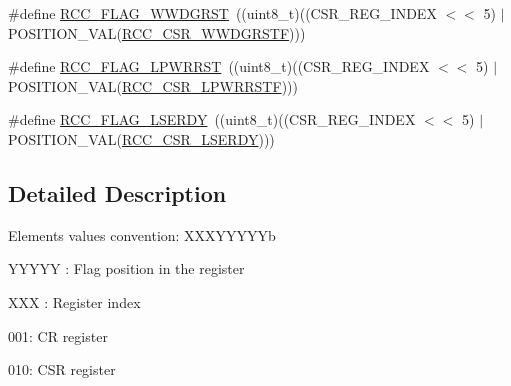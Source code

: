\begin{DoxyCompactItemize}
\item 
\#define \hyperlink{group___r_c_c___flag_gaa80b60b2d497ccd7b7de1075009999a7}{R\-C\-C\-\_\-\-F\-L\-A\-G\-\_\-\-W\-W\-D\-G\-R\-S\-T}~((uint8\-\_\-t)((C\-S\-R\-\_\-\-R\-E\-G\-\_\-\-I\-N\-D\-E\-X $<$$<$ 5) $\vert$ P\-O\-S\-I\-T\-I\-O\-N\-\_\-\-V\-A\-L(\hyperlink{group___peripheral___registers___bits___definition_gacabd7bbde7e78c9c8f5fd46e34771826}{R\-C\-C\-\_\-\-C\-S\-R\-\_\-\-W\-W\-D\-G\-R\-S\-T\-F})))
\item 
\#define \hyperlink{group___r_c_c___flag_ga67049531354aed7546971163d02c9920}{R\-C\-C\-\_\-\-F\-L\-A\-G\-\_\-\-L\-P\-W\-R\-R\-S\-T}~((uint8\-\_\-t)((C\-S\-R\-\_\-\-R\-E\-G\-\_\-\-I\-N\-D\-E\-X $<$$<$ 5) $\vert$ P\-O\-S\-I\-T\-I\-O\-N\-\_\-\-V\-A\-L(\hyperlink{group___peripheral___registers___bits___definition_ga675455250b91f125d52f5d347c2c0fbf}{R\-C\-C\-\_\-\-C\-S\-R\-\_\-\-L\-P\-W\-R\-R\-S\-T\-F})))
\item 
\#define \hyperlink{group___r_c_c___flag_gac9fb963db446c16e46a18908f7fe1927}{R\-C\-C\-\_\-\-F\-L\-A\-G\-\_\-\-L\-S\-E\-R\-D\-Y}~((uint8\-\_\-t)((C\-S\-R\-\_\-\-R\-E\-G\-\_\-\-I\-N\-D\-E\-X $<$$<$ 5) $\vert$ P\-O\-S\-I\-T\-I\-O\-N\-\_\-\-V\-A\-L(\hyperlink{group___peripheral___registers___bits___definition_gaef6f70de38e3cd825b7126ef317b955c}{R\-C\-C\-\_\-\-C\-S\-R\-\_\-\-L\-S\-E\-R\-D\-Y})))
\end{DoxyCompactItemize}


\subsection{Detailed Description}
Elements values convention\-: X\-X\-X\-Y\-Y\-Y\-Y\-Yb
\begin{DoxyItemize}
\item Y\-Y\-Y\-Y\-Y \-: Flag position in the register
\item X\-X\-X \-: Register index
\begin{DoxyItemize}
\item 001\-: C\-R register
\item 010\-: C\-S\-R register 
\end{DoxyItemize}
\end{DoxyItemize}

